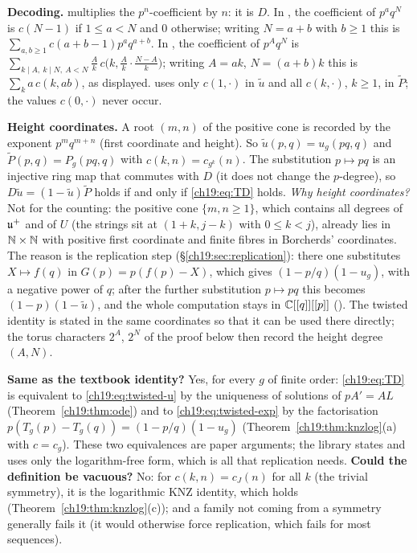 \begin{dictionary}
\textbf{Decoding.}   multiplies the $p^n$-coefficient by $n$: it is $D$.  In ,
the coefficient of $p^aq^N$ is $c(N-1)$ if $1\le a<N$ and $0$ otherwise; writing $N=a+b$ with $b\ge1$ this is
$\sum_{a,b\ge1}c(a+b-1)p^aq^{a+b}$.  In , the coefficient of $p^Aq^N$ is
$\sum_{k\mid A,\ k\mid N,\ A<N}\frac Ak\,c\bigl(k,\frac Ak\cdot\frac{N-A}k\bigr)$; writing $A=ak$, $N=(a+b)k$ this is
$\sum_k a\,c(k,ab)$, as displayed.   uses only $c(1,\cdot)$ in $\tilde u$ and all
$c(k,\cdot)$, $k\ge1$, in $\tilde P$; the values $c(0,\cdot)$ never occur.

\textbf{Height coordinates.}  A root $(m,n)$ of the positive cone is recorded by the exponent $p^mq^{m+n}$ (first
coordinate and height).  So $\tilde u(p,q)=u_g(pq,q)$ and $\tilde P(p,q)=P_g(pq,q)$ with $c(k,n)=c_{g^k}(n)$.  The substitution
$p\mapsto pq$ is an injective ring map that commutes with $D$ (it does not change the $p$-degree), so
$D\tilde u=(1-\tilde u)\tilde P$ holds if and only if \eqref{ch19:eq:TD} holds.  \emph{Why height coordinates?}  Not for the
counting: the positive cone $\{m,n\ge1\}$, which contains all degrees of $\mathfrak{u}^+$ and of $U$ (the strings sit at $(1+k,j-k)$
with $0\le k<j$), already lies in ${\mathbb{N}}\times{\mathbb{N}}$ with positive first coordinate and finite fibres in Borcherds' coordinates.  The reason
is the replication step (\S\ref{ch19:sec:replication}): there one substitutes $X\mapsto f(q)$ in $G(p)=p(f(p)-X)$, which gives
$(1-p/q)(1-u_g)$, with a negative power of $q$; after the further substitution $p\mapsto pq$ this becomes $(1-p)(1-\tilde u)$, and the
whole computation stays in ${\mathbb{C}}[[q]][[p]]$ ().  The twisted identity is stated in the same
coordinates so that it can be used there directly; the torus characters $2^{A}$, $2^{N}$ of the proof below then record the
height degree $(A,N)$.

\textbf{Same as the textbook identity?}  Yes, for every $g$ of finite order: \eqref{ch19:eq:TD} is equivalent to
\eqref{ch19:eq:twisted-u} by the uniqueness of solutions of $pA'=AL$ (Theorem~\ref{ch19:thm:ode}) and to
\eqref{ch19:eq:twisted-exp} by the factorisation $p(T_g(p)-T_g(q))=(1-p/q)(1-u_g)$ (Theorem~\ref{ch19:thm:knzlog}(a) with
$c=c_g$).  These two equivalences are paper arguments; the library states and uses only the logarithm-free form, which is
all that replication needs.  \textbf{Could the definition be vacuous?}  No: for $c(k,n)=c_J(n)$ for all $k$ (the trivial
symmetry), it is the logarithmic KNZ identity, which holds (Theorem~\ref{ch19:thm:knzlog}(c)); and a family not coming from a
symmetry generally fails it (it would otherwise force replication, which fails for most sequences).
\end{dictionary}
